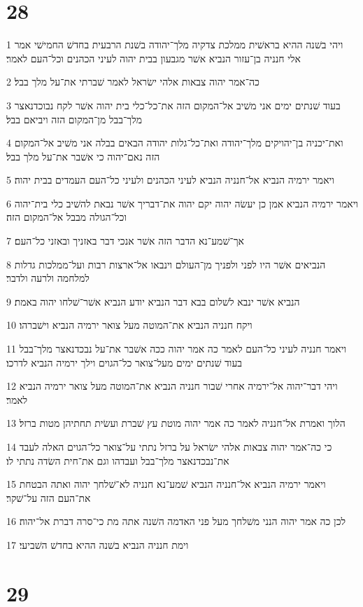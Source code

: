 \chapter{28}

\par 1 ויהי בשׁנה ההיא בראשׁית ממלכת צדקיה מלך־יהודה בשׁנת הרבעית בחדשׁ החמישׁי אמר אלי חנניה בן־עזור הנביא אשׁר מגבעון בבית יהוה לעיני הכהנים וכל־העם לאמר׃
\par 2 כה־אמר יהוה צבאות אלהי ישׂראל לאמר שׁברתי את־על מלך בבל׃
\par 3 בעוד שׁנתים ימים אני משׁיב אל־המקום הזה את־כל־כלי בית יהוה אשׁר לקח נבוכדנאצר מלך־בבל מן־המקום הזה ויביאם בבל׃
\par 4 ואת־יכניה בן־יהויקים מלך־יהודה ואת־כל־גלות יהודה הבאים בבלה אני משׁיב אל־המקום הזה נאם־יהוה כי אשׁבר את־על מלך בבל׃
\par 5 ויאמר ירמיה הנביא אל־חנניה הנביא לעיני הכהנים ולעיני כל־העם העמדים בבית יהוה׃
\par 6 ויאמר ירמיה הנביא אמן כן יעשׂה יהוה יקם יהוה את־דבריך אשׁר נבאת להשׁיב כלי בית־יהוה וכל־הגולה מבבל אל־המקום הזה׃
\par 7 אך־שׁמע־נא הדבר הזה אשׁר אנכי דבר באזניך ובאזני כל־העם׃
\par 8 הנביאים אשׁר היו לפני ולפניך מן־העולם וינבאו אל־ארצות רבות ועל־ממלכות גדלות למלחמה ולרעה ולדבר׃
\par 9 הנביא אשׁר ינבא לשׁלום בבא דבר הנביא יודע הנביא אשׁר־שׁלחו יהוה באמת׃
\par 10 ויקח חנניה הנביא את־המוטה מעל צואר ירמיה הנביא וישׁברהו׃
\par 11 ויאמר חנניה לעיני כל־העם לאמר כה אמר יהוה ככה אשׁבר את־על נבכדנאצר מלך־בבל בעוד שׁנתים ימים מעל־צואר כל־הגוים וילך ירמיה הנביא לדרכו׃
\par 12 ויהי דבר־יהוה אל־ירמיה אחרי שׁבור חנניה הנביא את־המוטה מעל צואר ירמיה הנביא לאמר׃
\par 13 הלוך ואמרת אל־חנניה לאמר כה אמר יהוה מוטת עץ שׁברת ועשׂית תחתיהן מטות ברזל׃
\par 14 כי כה־אמר יהוה צבאות אלהי ישׂראל על ברזל נתתי על־צואר כל־הגוים האלה לעבד את־נבכדנאצר מלך־בבל ועבדהו וגם את־חית השׂדה נתתי לו׃
\par 15 ויאמר ירמיה הנביא אל־חנניה הנביא שׁמע־נא חנניה לא־שׁלחך יהוה ואתה הבטחת את־העם הזה על־שׁקר׃
\par 16 לכן כה אמר יהוה הנני משׁלחך מעל פני האדמה השׁנה אתה מת כי־סרה דברת אל־יהוה׃
\par 17 וימת חנניה הנביא בשׁנה ההיא בחדשׁ השׁביעי׃

\chapter{29}

